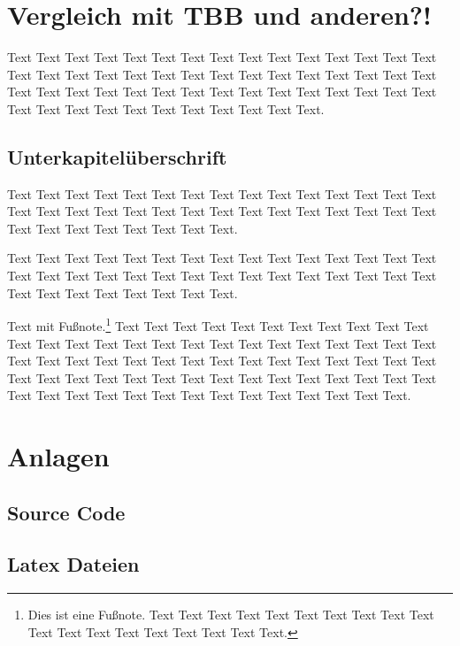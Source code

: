 \documentclass{lni}
\begin{document}
\pagebreak %

\section{Vergleich mit TBB und anderen?!}

Text Text Text Text Text Text Text Text Text Text Text Text Text Text Text Text Text Text Text Text Text Text Text Text Text Text Text Text Text Text Text Text Text Text Text Text Text Text Text Text Text Text Text Text Text Text Text Text Text Text Text Text Text Text Text Text.

\subsection{Unterkapitelüberschrift}

Text Text Text Text Text Text Text Text Text Text Text Text Text Text Text Text Text Text Text Text Text Text Text Text Text Text Text Text Text Text Text Text Text Text Text Text Text Text.


Text Text Text Text Text Text Text Text Text Text Text Text Text Text Text Text Text Text Text Text Text Text Text Text Text Text Text Text Text Text Text Text Text Text Text Text Text Text.

Text mit Fußnote.\footnote{Dies ist eine Fußnote. Text Text Text Text Text Text Text Text Text Text Text Text Text Text Text Text Text Text Text.} Text \cite{Ez99,ABC01} Text Text Text Text Text Text Text Text Text Text Text Text Text Text Text Text Text Text Text Text Text Text Text Text Text Text Text Text  Text Text Text Text Text Text Text Text Text Text Text Text Text Text Text Text Text Text Text Text Text Text Text Text Text Text Text Text Text Text Text Text Text Text Text Text Text Text Text Text Text.

\pagebreak

{}


\newpage

\listoffigures

\listoftables

\section{Anlagen}
\setcounter{subsection}{0} %
\minitoc


\subsection{Source Code}

\subsection{Latex Dateien}
\end{document}
